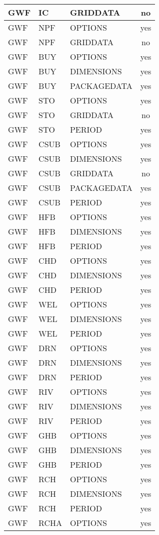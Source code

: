 \begin{longtable}{p{1.5cm} p{1.5cm} p{3cm} c}
\hline
GWF & IC & GRIDDATA & no \\ 
\hline
GWF & NPF & OPTIONS & yes \\ 
GWF & NPF & GRIDDATA & no \\ 
\hline
GWF & BUY & OPTIONS & yes \\ 
GWF & BUY & DIMENSIONS & yes \\ 
GWF & BUY & PACKAGEDATA & yes \\ 
\hline
GWF & STO & OPTIONS & yes \\ 
GWF & STO & GRIDDATA & no \\ 
GWF & STO & PERIOD & yes \\ 
\hline
GWF & CSUB & OPTIONS & yes \\ 
GWF & CSUB & DIMENSIONS & yes \\ 
GWF & CSUB & GRIDDATA & no \\ 
GWF & CSUB & PACKAGEDATA & yes \\ 
GWF & CSUB & PERIOD & yes \\ 
\hline
GWF & HFB & OPTIONS & yes \\ 
GWF & HFB & DIMENSIONS & yes \\ 
GWF & HFB & PERIOD & yes \\ 
\hline
GWF & CHD & OPTIONS & yes \\ 
GWF & CHD & DIMENSIONS & yes \\ 
GWF & CHD & PERIOD & yes \\ 
\hline
GWF & WEL & OPTIONS & yes \\ 
GWF & WEL & DIMENSIONS & yes \\ 
GWF & WEL & PERIOD & yes \\ 
\hline
GWF & DRN & OPTIONS & yes \\ 
GWF & DRN & DIMENSIONS & yes \\ 
GWF & DRN & PERIOD & yes \\ 
\hline
GWF & RIV & OPTIONS & yes \\ 
GWF & RIV & DIMENSIONS & yes \\ 
GWF & RIV & PERIOD & yes \\ 
\hline
GWF & GHB & OPTIONS & yes \\ 
GWF & GHB & DIMENSIONS & yes \\ 
GWF & GHB & PERIOD & yes \\ 
\hline
GWF & RCH & OPTIONS & yes \\ 
GWF & RCH & DIMENSIONS & yes \\ 
GWF & RCH & PERIOD & yes \\ 
\hline
GWF & RCHA & OPTIONS & yes \\ 

\end{longtable}
